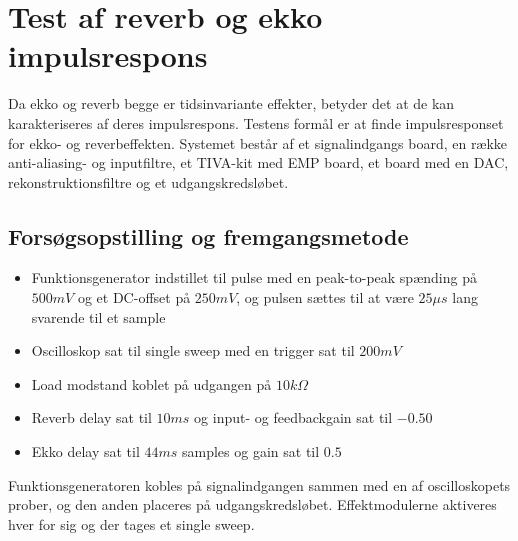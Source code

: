 \chapter{Test af reverb og ekko impulsrespons}\label{sec:test_af_effekt}
Da ekko og reverb begge er tidsinvariante effekter, betyder det at de kan karakteriseres af deres impulsrespons.\newline
Testens formål er at finde impulsresponset for ekko- og reverbeffekten.
Systemet består af et signalindgangs board, en række anti-aliasing- og inputfiltre, et TIVA-kit med EMP board, et board med en DAC, rekonstruktionsfiltre og et udgangskredsløbet.
\section{Forsøgsopstilling og fremgangsmetode}
\begin{itemize}
	\item Funktionsgenerator indstillet til pulse med en peak-to-peak spænding på $500\si{mV}$ og et DC-offset på $250\si{mV}$, og pulsen sættes til at være $25\si{\mu s}$ lang svarende til et sample
	\item Oscilloskop sat til single sweep med en trigger sat til $200\si{mV}$
	\item Load modstand koblet på udgangen på $10\si{k\Omega}$
	\item Reverb delay sat til $10\si{ms}$ og input- og feedbackgain sat til $-0.50$
	\item Ekko delay sat til $44\si{ms}$ samples og gain sat til $0.5$
\end{itemize}
Funktionsgeneratoren kobles på signalindgangen sammen med en af oscilloskopets prober, og den anden placeres på udgangskredsløbet.\newline
Effektmodulerne aktiveres hver for sig og der tages et single sweep.
